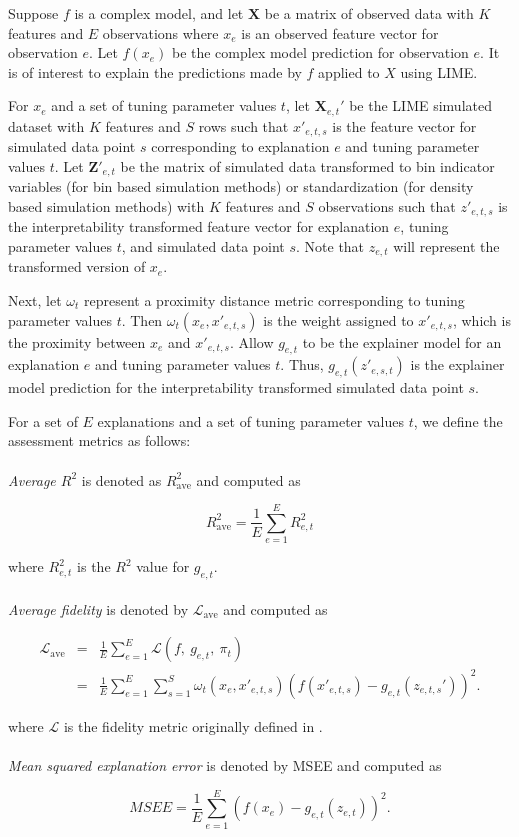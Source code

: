 \documentclass[AMS,STIX2COL]{WileyNJD-v2}\usepackage[]{graphicx}\usepackage[]{color}
\begin{document}
Suppose $f$ is a complex model, and let $\textbf{X}$ be a matrix of observed data with $K$ features and $E$ observations where $x_e$ is an observed feature vector for observation $e$. Let $f(x_e)$ be the complex model prediction for observation $e$. It is of interest to explain the predictions made by $f$ applied to $X$ using LIME.

For $x_e$ and a set of tuning parameter values $t$, let $\textbf{X}_{e,t}'$ be the LIME simulated dataset with $K$ features and $S$ rows such that $x'_{e,t,s}$ is the feature vector for simulated data point $s$ corresponding to explanation $e$ and tuning parameter values $t$. Let $\textbf{Z}'_{e,t}$ be the matrix of simulated data transformed to bin indicator variables (for bin based simulation methods) or standardization (for density based simulation methods) with $K$ features and $S$ observations such that $z'_{e,t,s}$ is the interpretability transformed feature vector for explanation $e$, tuning parameter values $t$, and simulated data point $s$. Note that $z_{e,t}$ will represent the transformed version of $x_e$.

Next, let $\omega_t$ represent a proximity distance metric corresponding to tuning parameter values $t$. Then $\omega_t\left(x_e, x'_{e,t,s}\right)$ is the weight assigned to $x'_{e,t,s}$, which is the proximity between $x_e$ and $x'_{e,t,s}$. Allow $g_{e,t}$ to be the explainer model for an explanation $e$ and tuning parameter values $t$. Thus, $g_{e,t}\left(z'_{e,s,t}\right)$ is the explainer model prediction for the interpretability transformed simulated data point $s$.

For a set of $E$ explanations and a set of tuning parameter values $t$, we define the assessment metrics as follows:\\
\\
\emph{Average $R^2$} is denoted as $R^2_{\mbox{ave}}$ and computed as

  $$R^2_{\mbox{ave}} = \frac{1}{E}\sum_{e=1}^E R_{e,t}^2$$

\noindent where $R_{e,t}^2$ is the $R^2$ value for $g_{e,t}$.\\
\\
\emph{Average fidelity} is denoted by $\mathcal{L}_{\mbox{ave}}$ and computed as

\begin{eqnarray*} \mathcal{L}_{\mbox{ave}} & = & \frac{1}{E}\sum_{e=1}^E\mathcal{L}(f, \ g_{e,t}, \ \pi_{t}) \\ & = & \frac{1}{E}\sum_{e=1}^E\sum_{s=1}^{S}\omega_{t}\left(x_e, x'_{e,t,s}\right)\left(f\left(x'_{e,t,s}\right)-g_{e,t}\left(z_{e,t,s}'\right)\right)^2. \end{eqnarray*}

\noindent where $\mathcal{L}$ is the fidelity metric originally defined in \citet{ribeiro:2016}.\\
\\
\emph{Mean squared explanation error} is denoted by MSEE and computed as

$$MSEE=\frac{1}{E}\sum_{e=1}^E\left(f\left(x_e\right)-g_{e,t}\left(z_{e,t}\right)\right)^2.$$
\end{document}
